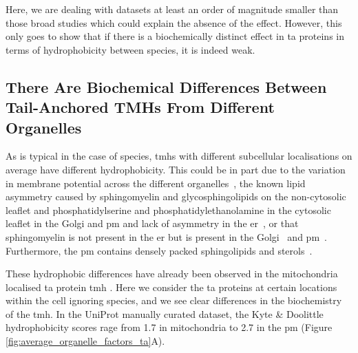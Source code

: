 Here, we are dealing with datasets at least an order of magnitude smaller than those broad studies \cite{Sharpe2010, Baker2017} which could explain the absence of the effect.
However, this only goes to show that if there is a biochemically distinct effect in \gls{ta} proteins in terms of hydrophobicity between species, it is indeed weak.


\subsection{There Are Biochemical Differences Between Tail-Anchored TMHs From Different Organelles}

As is typical in the case of species, \gls{tmh}s with different subcellular localisations on average have different hydrophobicity.
This could be in part due to the variation in membrane potential across the different organelles~\cite{Qin2011, Worley1994, Schapiro2000}, the known lipid asymmetry caused by sphingomyelin and glycosphingolipids on the non-cytosolic leaflet and phosphatidylserine and phosphatidylethanolamine in the cytosolic leaflet in the Golgi and \gls{pm} and lack of asymmetry in the \gls{er}~\cite{Daleke2007, Devaux2004}, or that sphingomyelin is not present in the \gls{er} but is present in the Golgi~\cite{Futerman2005} and \gls{pm}~\cite{Li2007, Tafesse2007}.
Furthermore, the \gls{pm} contains densely packed sphingolipids and sterols~\cite{Paolo2006}.

These hydrophobic differences have already been observed in the mitochondria localised \gls{ta} protein \gls{tmh} \cite{Borgese2003}.
Here we consider the \gls{ta} proteins at certain locations within the cell ignoring species, and we see clear differences in the biochemistry of the \gls{tmh}.
In the UniProt manually curated dataset, the Kyte \& Doolittle hydrophobicity scores rage from 1.7 in mitochondria to 2.7 in the \gls{pm} (Figure \ref{fig:average_organelle_factors_ta}A).

